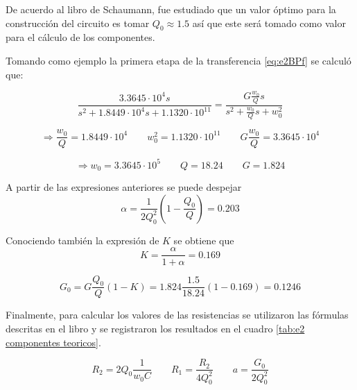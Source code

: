 De acuerdo al libro de Schaumann, fue estudiado que un valor óptimo para la construcción del circuito es tomar $Q_0 \approx 1.5$ así que este será tomado como valor para el cálculo de los componentes.

Tomando como ejemplo la primera etapa de la transferencia \eqref{eq:e2BPf} se calculó que:

\begin{equation}
\frac{3.3645\cdot 10^4s}{s^2 + 1.8449\cdot10^4 s + 1.1320\cdot10^{11}} = \frac{ G \frac{w_0}{Q}s }{s^2+ \frac{w_0}{Q}s+w_0^2}
\end{equation}

\begin{equation*}
\Rightarrow \frac{w_0}{Q}= 1.8449\cdot10^4	\qquad w_0^2=1.1320\cdot10^{11} \qquad	G \frac{w_0}{Q}=3.3645\cdot 10^4
\end{equation*}

\begin{equation}
\Rightarrow w_0=3.3645\cdot10^5 \qquad	Q=18.24 \qquad	G=1.824
\end{equation}

A partir de las expresiones anteriores se puede despejar
\begin{equation*}
\alpha=\frac{1}{2Q_0^2}\left(1-\frac{Q_0}{Q}\right) = 0.203
\end{equation*}

Conociendo también la expresión de $K$ se obtiene que
\begin{equation*}
K=\frac{\alpha}{1+\alpha} = 0.169
\end{equation*}

\begin{equation*}
G_0=G\frac{Q_0}{Q}(1-K) = 1.824\frac{1.5}{18.24}(1-0.169)=0.1246
\end{equation*}

Finalmente, para calcular los valores de las resistencias se utilizaron las fórmulas descritas en el libro y se registraron los resultados en el cuadro \ref{tab:e2 componentes teoricos}.

\begin{equation}
R_2=2Q_0\frac{1}{w_0C} \qquad R_1=\frac{R_2}{4Q_0^2} \qquad a=\frac{G_0}{2Q_0^2}
\end{equation}

